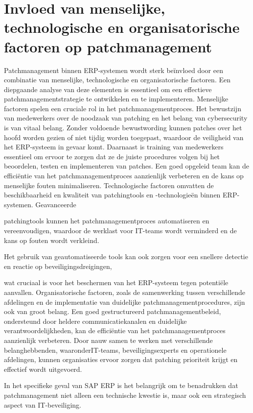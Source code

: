 \newpage

\section{Invloed van menselijke, technologische en organisatorische factoren op patchmanagement}

Patchmanagement binnen ERP-systemen wordt sterk beïnvloed door een combinatie van menselijke, technologische en organisatorische factoren. Een 
diepgaande analyse van deze elementen is essentieel om een effectieve patchmanagementstrategie te ontwikkelen en te implementeren. Menselijke 
factoren spelen een cruciale rol in het patchmanagementproces. Het bewustzijn van medewerkers over de noodzaak van patching en het belang van cybersecurity
is van vitaal belang. Zonder voldoende bewustwording kunnen patches over het hoofd worden gezien of niet tijdig worden toegepast, waardoor de veiligheid van het ERP-systeem in gevaar komt. Daarnaast 
is training van medewerkers essentieel om ervoor te zorgen dat ze de juiste procedures volgen bij het beoordelen, testen en implementeren van patches. 
Een goed opgeleid team kan de efficiëntie van het patchmanagementproces aanzienlijk verbeteren en de kans op menselijke fouten minimaliseren. Technologische 
factoren omvatten de beschikbaarheid en kwaliteit van patchingtools en -technologieën binnen ERP-systemen. Geavanceerde

patchingtools kunnen het patchmanagementproces automatiseren en vereenvoudigen, waardoor de werklast voor IT-teams wordt verminderd en de kans op fouten wordt verkleind. 

Het gebruik van geautomatiseerde tools kan ook zorgen voor een snellere detectie en reactie op beveiligingsdreigingen,

wat cruciaal is voor het beschermen van het ERP-systeem tegen potentiële aanvallen. Organisatorische factoren, zoals 
de samenwerking tussen verschillende afdelingen en de implementatie van duidelijke patchmanagementprocedures, zijn ook van groot belang. Een goed
 gestructureerd patchmanagementbeleid, ondersteund door heldere communicatiekanalen en duidelijke verantwoordelijkheden, kan de efficiëntie van het patchmanagementproces aanzienlijk verbeteren. Door nauw
  samen te werken met verschillende belanghebbenden, waaronderIT-teams, beveiligingsexperts en operationele afdelingen, kunnen organisaties ervoor zorgen dat patching prioriteit krijgt en effectief wordt uitgevoerd.


In het specifieke geval van SAP ERP is het belangrijk om te benadrukken dat patchmanagement niet alleen een technische kwestie is, maar ook een strategisch aspect van IT-beveiliging.

